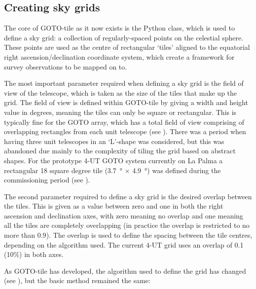 \subsection{Creating sky grids}
\label{sec:grids}
\begin{colsection}

The core of GOTO-tile as it now exists is the  Python class, which is used to define a sky grid: a collection of regularly-spaced points on the celestial sphere. These points are used as the centre of rectangular `tiles' aligned to the equatorial right ascension/declination coordinate system, which create a framework for survey observations to be mapped on to.

The most important parameter required when defining a sky grid is the field of view of the telescope, which is taken as the size of the tiles that make up the grid. The field of view is defined within GOTO-tile by giving a width and height value in degrees, meaning the tiles can only be square or rectangular. This is typically fine for the GOTO array, which has a total field of view comprising of overlapping rectangles from each unit telescope (see ). There was a period when having three unit telescopes in an `L'-shape was considered, but this was abandoned due mainly to the complexity of tiling the grid based on abstract shapes. For the prototype 4-UT GOTO system currently on La Palma a rectangular 18 square degree tile (\SI{3.7}{\degree} $\times$ \SI{4.9}{\degree}) was defined during the commissioning period (see ).

The second parameter required to define a sky grid is the desired overlap between the tiles. This is given as a value between zero and one in both the right ascension and declination axes, with zero meaning no overlap and one meaning all the tiles are completely overlapping (in practice the overlap is restricted to no more than $0.9$). The overlap is used to define the spacing between the tile centres, depending on the algorithm used. The current 4-UT grid uses an overlap of 0.1 (10\%) in both axes.

As GOTO-tile has developed, the algorithm used to define the grid has changed (see ), but the basic method remained the same:


\end{colsection}
